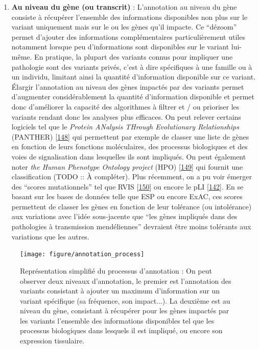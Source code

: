 \documentclass[12pt,twoside]{reedthesis}
\providecommand{\tightlist}{%
  \setlength{\itemsep}{0pt}\setlength{\parskip}{0pt}}
\theoremstyle{definition}
\theoremstyle{definition}
\theoremstyle{remark}
\begin{document}
  \begin{enumerate}
  \def\labelenumi{\arabic{enumi}.}
  \setcounter{enumi}{1}
  \tightlist
  \item
    \textbf{Au niveau du gène (ou transcrit)} : L'annotation au niveau du
    gène consiste à récupérer l'ensemble des informations disponibles non
    plus sur le variant uniquement mais sur le ou les gènes qu'il impacte.
    Ce ``dézoom'' permet d'ajouter des informations complémentaires
    particulièrement utiles notamment lorsque peu d'informations sont
    disponibles sur le variant lui-même. En pratique, la plupart des
    variants connus pour impliquer une pathologie sont des variants
    privés, c'est à dire spécifiques à une famille ou à un individu,
    limitant ainsi la quantité d'information disponible sur ce variant.
    Élargir l'annotation au niveau des gènes impactés par des variants
    permet d'augmenter considérablement la quantité d'information
    disponible et permet donc d'améliorer la capacité des algorithmes à
    filtrer et / ou prioriser les variants rendant donc les analyses plus
    efficaces. On peut relever certains logiciels tel que le \emph{Protein
    ANalysis THrough Evolutionary Relationships} (PANTHER)
    {[}\protect\hyperlink{ref-Mi2017}{148}{]} qui permettent par exemple
    de classer une liste de gènes en fonction de leurs fonctions
    moléculaires, des processus biologiques et des voies de signalisation
    dans lesquelles ils sont impliqués. On peut également noter \emph{the
    Human Phenotype Ontology project} (HPO)
    {[}\protect\hyperlink{ref-Kohler2014}{149}{]} qui fournit une
    classification (TODO :: À compléter). Plus récemment, on a pu voir
    émerger des ``scores mutationnels'' tel que RVIS
    {[}\protect\hyperlink{ref-Petrovski2013}{150}{]} ou encore le pLI
    {[}\protect\hyperlink{ref-Lek2016}{142}{]}. En se basant sur les bases
    de données telle que ESP ou encore ExAC, ces scores permettent de
    classer les gènes en fonction de leur tolérance (ou intolérance) aux
    variations avec l'idée sous-jacente que ``les gènes impliqués dans des
    pathologies à transmission mendéliennes'' devraient être moins
    tolérants aux variations que les autres.
  \end{enumerate}
  
  \begin{figure}
  
  {\centering \texttt{[image: figure/annotation\_process]} 
  
  }
  
  \caption[Représentation simplifié du processus d'annotation]{Représentation simplifié du processus d'annotation : On peut observer deux niveaux d'annotation, le premier est l'annotation des variants consistant à ajouter un maximum d'information sur un variant spécifique (sa fréquence, son impact...). La deuxième est au niveau du gène, consistant à récupérer pour les gènes impactés par les variants l'ensemble des informations disponibles tel que les processus biologiques dans lesquels il est impliqué, ou encore son expression tissulaire.}\label{fig:pictannot}
  \end{figure}
  
\end{document}
